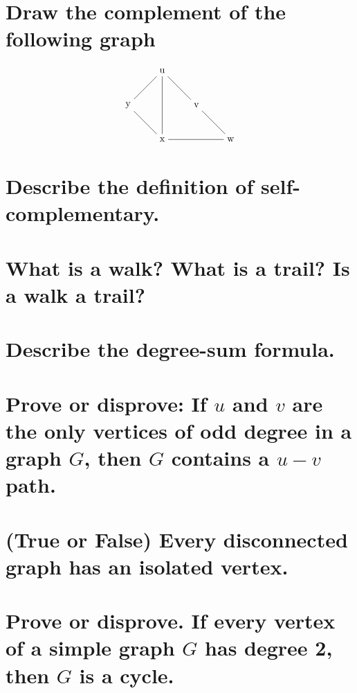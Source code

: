 \documentclass{article}
\begin{document}
\section{Draw the complement of the following graph}
\begin{equation}
\centering
\begin{tikzpicture}[node distance=5em]
	\node (u) at (0,0) {u};
	\node (y) [below left of=u] {y};
	\node (v) [below right of=u] {v};
	\node (x) [below right of=y] {x};
	\node (w) [below right of=v] {w};

	\path[-] (u) edge (y);
	\path[-] (u)  edge (v);
	\path[-]  (u) edge  (x);
	\path[-]  (y) edge  (x);
	\path[-]  (v) edge  (w);
	\path[-]  (x) edge  (w);
\end{tikzpicture}
\end{equation}

\section{Describe the definition of self-complementary.}
\section{What is a walk? What is a trail? Is a walk a trail?}
\section{Describe the degree-sum formula.}
\section{Prove or disprove: If $u$ and $v$ are the only vertices of odd degree in a graph $G$, then $G$ contains a $u-v$ path.}
\section{(True or False) Every disconnected graph has an isolated vertex.}
\section{Prove or disprove. If every vertex of a simple graph $G$ has degree 2, then $G$ is a cycle.}
\end{document}
